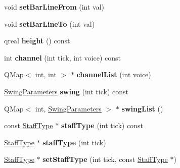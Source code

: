 \begin{DoxyCompactItemize}
void {\bfseries set\+Bar\+Line\+From} (int val)
\item 
\mbox{\label{class_ms_1_1_staff_aa8ccfbc96f984806afd573f4e93b11ff}} 
void {\bfseries set\+Bar\+Line\+To} (int val)
\item 
\mbox{\label{class_ms_1_1_staff_a6d5c3efe74ec1a9be56a1f8e3e88cd4b}} 
qreal {\bfseries height} () const
\item 
\mbox{\label{class_ms_1_1_staff_aff29539d8b22b353be1085b6ae3bf5e2}} 
int {\bfseries channel} (int tick, int voice) const
\item 
\mbox{\label{class_ms_1_1_staff_a253f6d5a48d0109fa27f0e5039133142}} 
Q\+Map$<$ int, int $>$ $\ast$ {\bfseries channel\+List} (int voice)
\item 
\mbox{\label{class_ms_1_1_staff_af57009797a1411e15168f6de848a3b6f}} 
\hyperlink{struct_ms_1_1_swing_parameters}{Swing\+Parameters} {\bfseries swing} (int tick) const
\item 
\mbox{\label{class_ms_1_1_staff_a8396a46f5be5653168e530512e967912}} 
Q\+Map$<$ int, \hyperlink{struct_ms_1_1_swing_parameters}{Swing\+Parameters} $>$ $\ast$ {\bfseries swing\+List} ()
\item 
\mbox{\label{class_ms_1_1_staff_ae5e97ecda5b063a3f1bb176338e05a17}} 
const \hyperlink{class_ms_1_1_staff_type}{Staff\+Type} $\ast$ {\bfseries staff\+Type} (int tick) const
\item 
\mbox{\label{class_ms_1_1_staff_a78a8b975f520e31e6d49e22676e5f6b4}} 
\hyperlink{class_ms_1_1_staff_type}{Staff\+Type} $\ast$ {\bfseries staff\+Type} (int tick)
\item 
\mbox{\label{class_ms_1_1_staff_a880a77281d52889227a555b43662d752}} 
\hyperlink{class_ms_1_1_staff_type}{Staff\+Type} $\ast$ {\bfseries set\+Staff\+Type} (int tick, const \hyperlink{class_ms_1_1_staff_type}{Staff\+Type} $\ast$)
\item 
\mbox{\label{class_ms_1_1_staff_a5126c2e53dc51fc102ba0072425484f3}} 

\end{DoxyCompactItemize}
